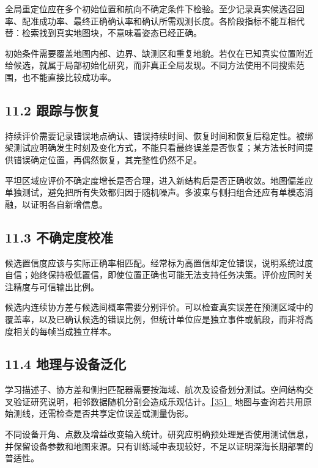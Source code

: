 全局重定位应在多个初始位置和航向不确定条件下检验。至少记录真实候选召回率、配准成功率、最终正确确认率和确认所需观测长度。各阶段指标不能互相代替：检索找到真实地图块，不意味着姿态已经正确。

初始条件需要覆盖地图内部、边界、缺测区和重复地貌。若仅在已知真实位置附近给候选，就属于局部初始化研究，而非真正全局发现。不同方法使用不同搜索范围，也不能直接比较成功率。

\hypertarget{ux8ddfux8e2aux4e0eux6062ux590d}{%
\subsection{11.2 跟踪与恢复}\label{ux8ddfux8e2aux4e0eux6062ux590d}}

持续评价需要记录错误地点确认、错误持续时间、恢复时间和恢复后稳定性。被绑架测试应明确发生时刻及变化方式，不能只看最终误差是否恢复；某方法长时间提供错误确定位置，再偶然恢复，其完整性仍然不足。

平坦区域应评价不确定度增长是否合理，进入新结构后是否正确收敛。地图偏差应单独测试，避免把所有失效都归因于随机噪声。多波束与侧扫组合还应有单模态消融，以证明各自新增信息。

\hypertarget{ux4e0dux786eux5b9aux5ea6ux6821ux51c6}{%
\subsection{11.3 不确定度校准}\label{ux4e0dux786eux5b9aux5ea6ux6821ux51c6}}

候选置信度应该与实际正确率相匹配。经常标为高置信却定位错误，说明系统过度自信；始终保持极低置信，即使位置正确也可能无法支持任务决策。评价应同时关注精度与可信输出比例。

候选内连续协方差与候选间概率需要分别评价。可以检查真实误差在预测区域中的覆盖率，以及已确认候选的错误比例，但统计单位应是独立事件或航段，而非将高度相关的每帧当成独立样本。

\hypertarget{ux5730ux7406ux4e0eux8bbeux5907ux6cdbux5316}{%
\subsection{11.4 地理与设备泛化}\label{ux5730ux7406ux4e0eux8bbeux5907ux6cdbux5316}}

学习描述子、协方差和侧扫匹配器需要按海域、航次及设备划分测试。空间结构交叉验证研究说明，相邻数据随机分割会造成乐观估计。\href{https://doi.org/10.1111/ecog.02881}{［35］} 地图与查询若共用原始测线，还需检查是否共享定位误差或测量伪影。

不同设备开角、点数及增益改变输入统计。研究应明确预处理是否使用测试信息，并保留设备参数和地图来源。只有训练域中表现较好，不足以证明深海长期部署的普适性。

